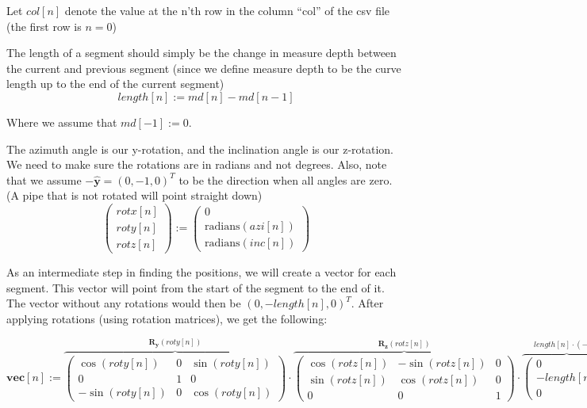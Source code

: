 Let \(col[n]\) denote the value at the n'th row in the column ``col'' of
the csv file (the first row is \(n=0\))

The length of a segment should simply be the change in measure depth
between the current and previous segment (since we define measure depth
to be the curve length up to the end of the current segment)
\[length[n]:=md[n]-md[n-1]\]

Where we assume that \(md[-1]:=0\).

The azimuth angle is our y-rotation, and the inclination angle is our
z-rotation. We need to make sure the rotations are in radians and not
degrees. Also, note that we assume \(\mathbf{-\hat y}=(0, -1, 0)^T\) to
be the direction when all angles are zero. (A pipe that is not rotated
will point straight down) \[\begin{pmatrix}
rotx[n]\\
roty[n]\\
rotz[n]
\end{pmatrix}:=\begin{pmatrix}
0\\
\text{radians}(azi[n])\\
\text{radians}(inc[n])
\end{pmatrix}\]

As an intermediate step in finding the positions, we will create a
vector for each segment. This vector will point from the start of the
segment to the end of it. The vector without any rotations would then be
\((0, -length[n], 0)^T\). After applying rotations (using rotation
matrices), we get the following:

\[
\mathbf{vec}[n]:=
\overbrace{
\begin{pmatrix}
\cos (roty[n]) & 0 & \sin (roty[n])\\
0 & 1 & 0\\
-\sin (roty[n]) & 0 & \cos (roty[n])
\end{pmatrix}}^{\mathbf{R_y}(roty[n])} \cdot \overbrace{\begin{pmatrix}
\cos (rotz[n]) & -\sin (rotz[n]) & 0 \\
\sin (rotz[n]) & \cos (rotz[n]) & 0\\
0 & 0 & 1
\end{pmatrix}}^{\mathbf{R_z}(rotz[n])} \cdot \overbrace{\begin{pmatrix}
0\\
-length[n]\\
0
\end{pmatrix}}^{length[n]\cdot (\mathbf{-\hat y})}
\]

